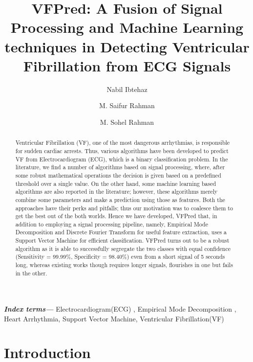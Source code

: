 \documentclass[12pt,a4paper]{article}
\title{VFPred: A Fusion of Signal Processing and Machine Learning techniques in Detecting Ventricular Fibrillation from ECG Signals}
\author[1]{Nabil Ibtehaz}
\author[1]{M. Saifur Rahman}
\author[1,*]{M. Sohel Rahman}
\affil[ ]{ 1017052037@grad.cse.buet.ac.bd \\ \{mrahman,msrahman\}@cse.buet.ac.bd}
\affil[1]{Department of CSE, BUET,\protect\\ ECE Building, West Palasi, Dhaka-1205, Bangladesh}
\affil[*]{Corresponding author}
\providecommand{\keywords}[1]{\textbf{\textit{Index terms---}} #1}
\begin{document}
\maketitle


\begin{abstract}

Ventricular Fibrillation (VF), one of the most dangerous arrhythmias, is responsible for sudden cardiac arrests. Thus, various algorithms have been developed to predict VF from Electrocardiogram (ECG), which is a binary classification problem. In the literature, we find a number of algorithms based on signal processing, where, after some robust mathematical operations the decision is given based on a predefined threshold over a single value. On the other hand, some machine learning based algorithms are also reported in the literature; however, these algorithms merely combine some parameters and make a prediction using those as features. Both the approaches have their perks and pitfalls; thus our motivation was to coalesce them to get the best out of the both worlds. Hence we have developed, VFPred that, in addition to employing a signal processing pipeline, namely, Empirical Mode Decomposition and Discrete Fourier Transform for useful feature extraction, uses a Support Vector Machine for efficient classification. VFPred turns out to be a robust algorithm as it is able to successfully segregate the two classes with equal confidence (Sensitivity = 99.99\%, Specificity = 98.40\%) even from a short signal of 5 seconds long, whereas existing works though requires longer signals, flourishes in one but fails in the other.
\end{abstract}

\keywords{Electrocardiogram(ECG) , Empirical Mode Decomposition , Heart Arrhythmia, Support Vector Machine, Ventricular Fibrillation(VF)}

\clearpage

\section{Introduction}
\label{Introduction}
\end{document}
